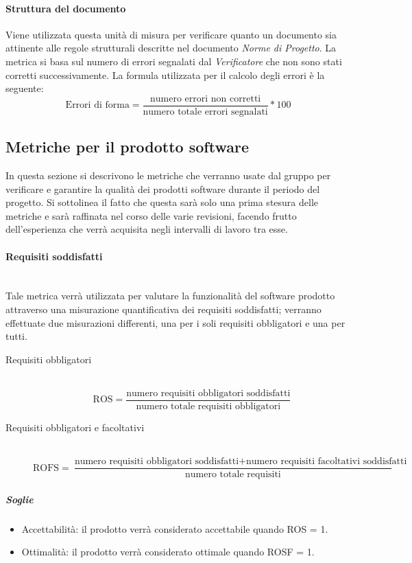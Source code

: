 \paragraph{Struttura del documento}
Viene utilizzata questa unità di misura per verificare quanto un documento sia attinente alle regole strutturali descritte nel documento \textit{Norme di Progetto}.
La metrica si basa sul numero di errori segnalati dal \textit{Verificatore} che non sono stati corretti successivamente.
\newline La formula utilizzata per il calcolo degli errori è la seguente:
\begin{displaymath}
\mbox{Errori di forma}=\frac{\mbox{numero errori non corretti}}{\mbox{numero totale errori segnalati}}*100
\end{displaymath}
\subsection{Metriche per il prodotto software}
\label{AppB:metricheProd}
In questa sezione si descrivono le metriche che verranno usate dal gruppo per verificare e garantire la qualità dei prodotti software durante il periodo del progetto. Si sottolinea il fatto che questa sarà solo una prima stesura delle metriche e sarà raffinata nel corso delle varie revisioni, facendo frutto dell'esperienza che verrà acquisita negli intervalli di lavoro tra esse.

\paragraph{Requisiti soddisfatti}
	~\\Tale metrica verrà utilizzata per valutare la funzionalità del software prodotto attraverso una misurazione quantificativa dei requisiti soddisfatti; verranno effettuate due misurazioni differenti, una per i soli requisiti obbligatori e una per tutti.

\begin{description}
\item[Requisiti obbligatori]
	~\\ \begin{displaymath}
		\mbox{ROS}=\frac{\mbox{numero requisiti obbligatori soddisfatti}}{\mbox{numero totale requisiti obbligatori}}
	\end{displaymath}
	
\item[Requisiti obbligatori e facoltativi]
	~\\ \begin{displaymath}
		\mbox{ROFS}=\frac{\mbox{numero requisiti obbligatori soddisfatti} + \mbox{numero requisiti facoltativi soddisfatti}}{\mbox{numero totale requisiti}}
	\end{displaymath}
\end{description}

\subparagraph{Soglie}
\begin{itemize}
\item Accettabilità: il prodotto verrà considerato accettabile quando ROS = 1.
\item Ottimalità: il prodotto verrà considerato ottimale quando ROSF = 1.
\end{itemize}

\paragraph{}
